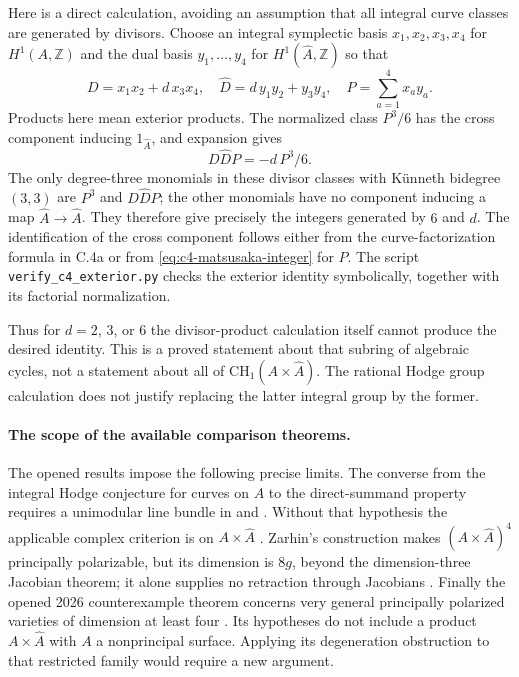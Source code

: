 Here is a direct calculation, avoiding an assumption that all
integral curve classes are generated by divisors. Choose an
integral symplectic basis $x_1,x_2,x_3,x_4$ for $H^1(A,\mathbb Z)$
and the dual basis $y_1,\ldots,y_4$ for $H^1(\widehat A,\mathbb Z)$
so that
\[
 D=x_1x_2+d\,x_3x_4,\quad
 \widehat D=d\,y_1y_2+y_3y_4,\quad
 P=\sum_{a=1}^{4}x_ay_a.
\]
Products here mean exterior products. The normalized class
$P^3/6$ has the cross component inducing $1_{\widehat A}$, and
expansion gives
\begin{equation}\label{eq:c4-surface-exterior}
                 D\widehat D P=-d\,P^3/6.
\end{equation}
The only degree-three monomials in these divisor classes with
K\"unneth bidegree $(3,3)$ are $P^3$ and $D\widehat D P$;
the other monomials have no component inducing a map
$\widehat A\to\widehat A$. They therefore give precisely the
integers generated by $6$ and $d$.
The identification of the cross component follows either from
the curve-factorization formula in C.4a or from
\eqref{eq:c4-matsusaka-integer} for $P$.
The script \texttt{verify\_c4\_exterior.py} checks the exterior
identity symbolically, together with its factorial normalization.

Thus for $d=2$, $3$, or $6$ the divisor-product calculation itself
cannot produce the desired identity. This is a proved statement
about that subring of algebraic cycles, not a statement about
all of $\mathrm{CH}_1(A\times\widehat A)$.
The rational Hodge group calculation does not justify replacing
the latter integral group by the former.

\paragraph{The scope of the available comparison theorems.}
The opened results impose the following precise limits.
The converse from the integral Hodge conjecture for curves on
$A$ to the direct-summand property requires a unimodular line
bundle in \citet[Theorem 1.1 and the paragraph immediately
following it]{cyBeckmannFortman2023} and
\citet[Theorem 1.1 and the paragraph following it]{cyScaviaSuzuki2025}.
Without that hypothesis the applicable complex criterion is on
$A\times\widehat A$
\citep[Theorem 1.4]{cyVoisin2024}.
Zarhin's construction makes $(A\times\widehat A)^4$ principally
polarizable, but its dimension is $8g$, beyond the
dimension-three Jacobian theorem; it alone supplies no retraction
through Jacobians \citep[Remarks 16.12--16.13]{frC4Milne1986}.
Finally the opened 2026 counterexample theorem concerns very
general principally polarized varieties of dimension at least
four \citep[Theorem 1.1 and Corollary 1.5]{cyEngelFortmanSchreieder2026}.
Its hypotheses do not include a product $A\times\widehat A$
with $A$ a nonprincipal surface. Applying its degeneration
obstruction to that restricted family would require a new argument.
